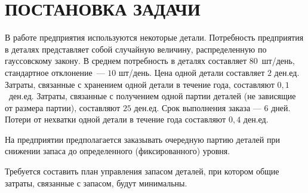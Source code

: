 \section{ПОСТАНОВКА ЗАДАЧИ}

В работе предприятия используются некоторые детали.
Потребность предприятия в деталях представляет собой случайную величину,
распределенную по гауссовскому закону. В среднем потребность в
деталях составляет $80$ шт/день, стандартное отклонение --- $10$ шт/день.
Цена одной детали составляет $2$ ден.ед.
Затраты, связанные с хранением одной детали в течение года,
составляют $0{,}1$ ден.ед. Затраты, связанные с получением
одной партии деталей (не зависящие от размера партии),
составляют $25$ ден.ед. Срок выполнения заказа --- $6$ дней.
Потери от нехватки одной детали в течение года составляют $0{,}4$ ден.ед.

На предприятии предполагается заказывать очередную партию деталей
при снижении запаса до определенного (фиксированного) уровня.

Требуется составить план управления запасом деталей,
при котором общие затраты, связанные с запасом, будут минимальны.